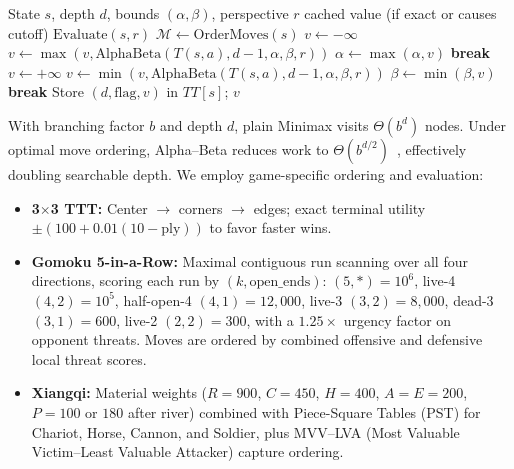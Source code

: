 \documentclass[conference]{IEEEtran}
\begin{document}
\begin{algorithm}[t]
\caption{Alpha--Beta Pruning with Ordering and TT}
\label{alg:alphabeta}
\begin{algorithmic}[1]
\Require State $s$, depth $d$, bounds $(\alpha, \beta)$, perspective $r$
    \State \Return cached value (if exact or causes cutoff)
\EndIf
{}
    \State \Return $\mathrm{Evaluate}(s, r)$
\EndIf
\State $\mathcal{M} \gets \mathrm{OrderMoves}(s)$
    \State $v \gets -\infty$
        \State $v \gets \max(v, \mathrm{AlphaBeta}(T(s,a), d-1, \alpha, \beta, r))$
        \State $\alpha \gets \max(\alpha, v)$
        \If{$\alpha \ge \beta$} \textbf{break}  \EndIf
    \EndFor
\Else
    \State $v \gets +\infty$
        \State $v \gets \min(v, \mathrm{AlphaBeta}(T(s,a), d-1, \alpha, \beta, r))$
        \State $\beta \gets \min(\beta, v)$
        \If{$\alpha \ge \beta$} \textbf{break}  \EndIf
    \EndFor
\EndIf
\State Store $(d, \mathrm{flag}, v)$ in $TT[s]$; \Return $v$
\end{algorithmic}
\end{algorithm}

With branching factor $b$ and depth $d$, plain Minimax visits $\Theta(b^d)$ nodes. Under optimal move ordering, Alpha--Beta reduces work to $\Theta(b^{d/2})$~\cite{knuth1975}, effectively doubling searchable depth. We employ game-specific ordering and evaluation:
\begin{itemize}
    \item \textbf{3$\times$3 TTT:} Center $\to$ corners $\to$ edges; exact terminal utility $\pm (100 + 0.01(10 - \text{ply}))$ to favor faster wins.
    \item \textbf{Gomoku 5-in-a-Row:} Maximal contiguous run scanning over all four directions, scoring each run by $(k, \text{open\_ends})$: $(5,*)=10^6$, live-4 $(4,2)=10^5$, half-open-4 $(4,1)=12{,}000$, live-3 $(3,2)=8{,}000$, dead-3 $(3,1)=600$, live-2 $(2,2)=300$, with a $1.25\times$ urgency factor on opponent threats. Moves are ordered by combined offensive and defensive local threat scores.
    \item \textbf{Xiangqi:} Material weights ($R=900$, $C=450$, $H=400$, $A=E=200$, $P=100$ or $180$ after river) combined with Piece-Square Tables (PST) for Chariot, Horse, Cannon, and Soldier, plus MVV--LVA (Most Valuable Victim--Least Valuable Attacker) capture ordering.
\end{itemize}
\end{document}
